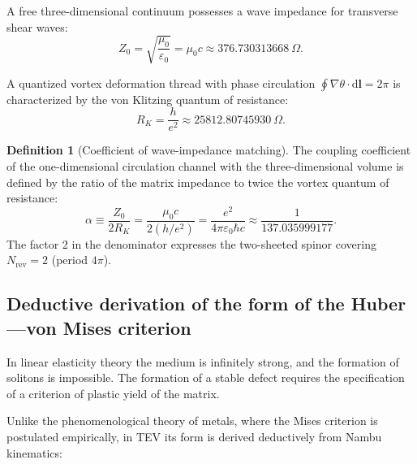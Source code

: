 \documentclass[11pt,a4paper]{article}
\theoremstyle{definition}
\newtheorem{definition}{Definition}
\theoremstyle{remark}
\begin{document}
A free three-dimensional continuum possesses a wave impedance for transverse shear waves:
\begin{equation}
Z_0 = \sqrt{\frac{\mu_0}{\varepsilon_0}} = \mu_0 c \approx 376.730313668\ \Omega.
\label{eq:wave_impedance_z0}
\end{equation}

A quantized vortex deformation thread with phase circulation $\oint \nabla\theta \cdot \mathrm{d}\mathbf{l} = 2\pi$ is characterized by the von Klitzing quantum of resistance:
\begin{equation}
R_K = \frac{h}{e^2} \approx 25812.80745930\ \Omega.
\label{eq:klitzing_rk_def}
\end{equation}

\begin{definition}[Coefficient of wave-impedance matching]
The coupling coefficient of the one-dimensional circulation channel with the three-dimensional volume is defined by the ratio of the matrix impedance to twice the vortex quantum of resistance:
\begin{equation}
\alpha \equiv \frac{Z_0}{2 R_K} = \frac{\mu_0 c}{2 (h/e^2)} = \frac{e^2}{4\pi \varepsilon_0 \hbar c} \approx \frac{1}{137.035999177}.
\label{eq:alpha_def}
\end{equation}
The factor 2 in the denominator expresses the two-sheeted spinor covering $N_{\mathrm{rev}} = 2$ (period $4\pi$).
\end{definition}

\subsection{Deductive derivation of the form of the Huber---von Mises criterion}

In linear elasticity theory the medium is infinitely strong, and the formation of solitons is impossible. The formation of a stable defect requires the specification of a criterion of plastic yield of the matrix.

Unlike the phenomenological theory of metals, where the Mises criterion is postulated empirically, in TEV its form is derived deductively from Nambu kinematics:
\end{document}
